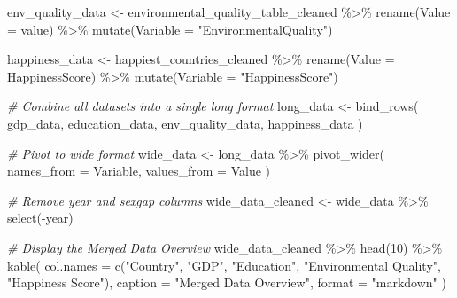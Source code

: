 \documentclass[
]{article}
\newenvironment{Shaded}{\begin{snugshade}}{\end{snugshade}}
\newcommand{\AttributeTok}[1]{\textcolor[rgb]{0.77,0.63,0.00}{#1}}
\newcommand{\CommentTok}[1]{\textcolor[rgb]{0.56,0.35,0.01}{\textit{#1}}}
\newcommand{\DecValTok}[1]{\textcolor[rgb]{0.00,0.00,0.81}{#1}}
\newcommand{\FunctionTok}[1]{\textcolor[rgb]{0.00,0.00,0.00}{#1}}
\newcommand{\NormalTok}[1]{#1}
\newcommand{\OtherTok}[1]{\textcolor[rgb]{0.56,0.35,0.01}{#1}}
\newcommand{\SpecialCharTok}[1]{\textcolor[rgb]{0.00,0.00,0.00}{#1}}
\newcommand{\StringTok}[1]{\textcolor[rgb]{0.31,0.60,0.02}{#1}}
\begin{document}
\begin{Shaded}
\begin{Highlighting}[]
\NormalTok{env\_quality\_data }\OtherTok{\textless{}{-}}\NormalTok{ environmental\_quality\_table\_cleaned }\SpecialCharTok{\%\textgreater{}\%}
  \FunctionTok{rename}\NormalTok{(}\AttributeTok{Value =}\NormalTok{ value) }\SpecialCharTok{\%\textgreater{}\%}
  \FunctionTok{mutate}\NormalTok{(}\AttributeTok{Variable =} \StringTok{"EnvironmentalQuality"}\NormalTok{)}

\NormalTok{happiness\_data }\OtherTok{\textless{}{-}}\NormalTok{ happiest\_countries\_cleaned }\SpecialCharTok{\%\textgreater{}\%}
  \FunctionTok{rename}\NormalTok{(}\AttributeTok{Value =}\NormalTok{ HappinessScore) }\SpecialCharTok{\%\textgreater{}\%}
  \FunctionTok{mutate}\NormalTok{(}\AttributeTok{Variable =} \StringTok{"HappinessScore"}\NormalTok{)}

\CommentTok{\# Combine all datasets into a single long format}
\NormalTok{long\_data }\OtherTok{\textless{}{-}} \FunctionTok{bind\_rows}\NormalTok{(}
\NormalTok{  gdp\_data,}
\NormalTok{  education\_data,}
\NormalTok{  env\_quality\_data,}
\NormalTok{  happiness\_data}
\NormalTok{)}

\CommentTok{\# Pivot to wide format}
\NormalTok{wide\_data }\OtherTok{\textless{}{-}}\NormalTok{ long\_data }\SpecialCharTok{\%\textgreater{}\%}
  \FunctionTok{pivot\_wider}\NormalTok{(}
    \AttributeTok{names\_from =}\NormalTok{ Variable,}
    \AttributeTok{values\_from =}\NormalTok{ Value}
\NormalTok{  )}

\CommentTok{\# Remove year and sexgap columns}
\NormalTok{wide\_data\_cleaned }\OtherTok{\textless{}{-}}\NormalTok{ wide\_data }\SpecialCharTok{\%\textgreater{}\%}
  \FunctionTok{select}\NormalTok{(}\SpecialCharTok{{-}}\NormalTok{year) }

\CommentTok{\# Display the Merged Data Overview}
\NormalTok{wide\_data\_cleaned }\SpecialCharTok{\%\textgreater{}\%}
  \FunctionTok{head}\NormalTok{(}\DecValTok{10}\NormalTok{) }\SpecialCharTok{\%\textgreater{}\%} 
  \FunctionTok{kable}\NormalTok{(}
    \AttributeTok{col.names =} \FunctionTok{c}\NormalTok{(}\StringTok{"Country"}\NormalTok{, }\StringTok{"GDP"}\NormalTok{, }\StringTok{"Education"}\NormalTok{, }\StringTok{"Environmental Quality"}\NormalTok{, }\StringTok{"Happiness Score"}\NormalTok{),}
    \AttributeTok{caption =} \StringTok{"Merged Data Overview"}\NormalTok{,}
    \AttributeTok{format =} \StringTok{"markdown"}
\NormalTok{  )}
\end{Highlighting}
\end{Shaded}
\end{document}
